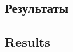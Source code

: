 \begin{Russian}
\section{Результаты}
\end{Russian}
\begin{English}
\section{Results}
\end{English}
\label{sec:results}

\begin{Russian}

\end{Russian}
\begin{English}

\end{English}


